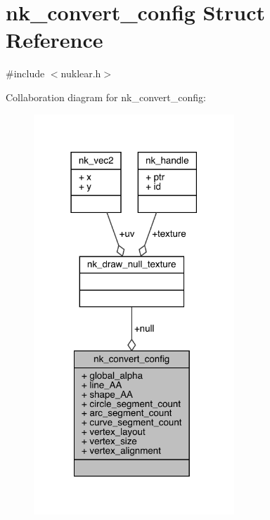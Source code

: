 \hypertarget{structnk__convert__config}{}\section{nk\+\_\+convert\+\_\+config Struct Reference}
\label{structnk__convert__config}


{\ttfamily \#include $<$nuklear.\+h$>$}



Collaboration diagram for nk\+\_\+convert\+\_\+config\+:
\nopagebreak
\begin{figure}[H]
\begin{center}
\leavevmode
\includegraphics[width=214pt]{structnk__convert__config__coll__graph}
\end{center}
\end{figure}
